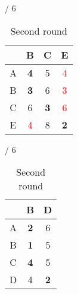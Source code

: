 \documentclass[a4paper, 11 pt, article, accentcolor=tud7b]{tudreport}
\begin{document}
\begin{table}[h]
\begin{subtable}[b]{\textwidth / 6}
\begin{tabular}{| c | c | c | c |}
	    \hline
	      & B                   & C           & E           \\ \hline
	    A & \textbf{4}          & 5           & \textcolor{red}{4} \\ \hline
	    B & \textbf{3}          & 6           & \textcolor{red}{3} \\ \hline
	    C & 6                   & \textbf{3}  & \textcolor{red}{6} \\ \hline
	    E & \textcolor{red}{4}  & 8           & \textbf{2}  \\ \hline
	    \end{tabular}
	    \caption{$D^{D}$}
	  \end{subtable}
	  \hfill
	  \begin{subtable}[b]{\textwidth / 6}
	    \begin{tabular}{| c | c | c |}
	    \hline
	      & B          & D           \\ \hline
	    A & \textbf{2} & 6           \\ \hline
	    B & \textbf{1} & 5           \\ \hline
	    C & \textbf{4} & 5           \\ \hline
	    D & 4          & \textbf{2}  \\ \hline
	    \end{tabular}
	    \caption{$D^{E}$}
	  \end{subtable}
	  \caption{Second round}
	\end{table}
\end{document}
